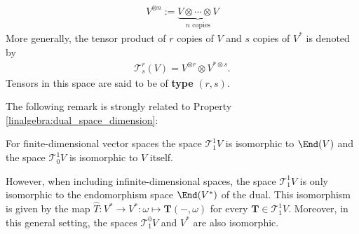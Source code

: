     \begin{notation}\label{vector:type}
        \begin{gather}
            V^{\otimes n} := \underbrace{V\otimes\cdots\otimes V}_{n\text{ copies}}
        \end{gather}
        More generally, the tensor product of $r$ copies of $V$ and $s$ copies of $V^*$ is denoted by
        \begin{gather}
            \mathcal{T}^r_s(V) = V^{\otimes r}\otimes V^{*\otimes s}.
        \end{gather}
        Tensors in this space are said to be of \textbf{type} $(r,s)$.
    \end{notation}

    The following remark is strongly related to Property \ref{linalgebra:dual_space_dimension}:
    \begin{remark}
        For finite-dimensional vector spaces the space $\mathcal{T}^1_1V$ is isomorphic to $\End(V)$ and the space $\mathcal{T}^1_0V$ is isomorphic to $V$ itself.

        However, when including infinite-dimensional spaces, the space $\mathcal{T}^1_1V$ is only isomorphic to the endomorphism space $\End(V^*)$ of the dual. This isomorphism is given by the map $\hat{T}:V^*\rightarrow V^*:\omega\mapsto\mathbf{T}(-,\omega)$ for every $\mathbf{T}\in\mathcal{T}^1_1V$. Moreover, in this general setting, the spaces $\mathcal{T}^0_1V$ and $V^*$ are also isomorphic.
    \end{remark}

